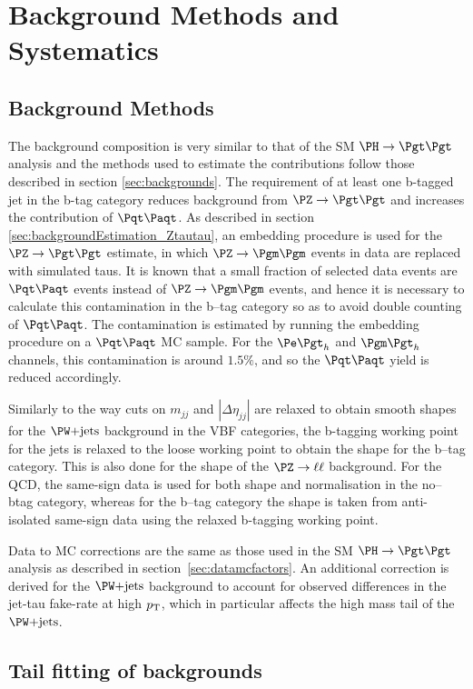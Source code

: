 \section{Background Methods and Systematics}
\label{sec:mssmBackgroundsSysts}

\subsection{Background Methods}
\label{sec:mssmBackgrounds}
The background composition is very similar to that of the \ac{SM} $\HToTauTau$
analysis and the methods used to estimate the contributions follow those
described in section \ref{sec:backgrounds}. The requirement of at least one
b-tagged jet in the b-tag category reduces background from $\ZToTauTau$
and increases the contribution of $\ttbar$. As described in section
\ref{sec:backgroundEstimation_Ztautau}, an embedding procedure is used for the
$\ZToTauTau$ estimate, in which $\PZ\to\Pgm\Pgm$ events in data are replaced
with simulated taus. It is known that a small fraction of selected data events
are $\ttbar$ events instead of $\PZ\to\Pgm\Pgm$ events, and hence it is
necessary to calculate this contamination in the b--tag category so as to avoid
double counting of $\ttbar$. The contamination is estimated by running the
embedding procedure on a $\ttbar$ \ac{MC} sample. For the $\etau$ and $\mutau$ channels, this
contamination is around $1.5\%$, and so the $\ttbar$ yield is reduced
accordingly. 

Similarly to the way cuts on $m_{jj}$ and $|\Delta\eta_{jj}|$ are relaxed to
obtain smooth shapes for the $\WJets$ background in the VBF categories, the
b-tagging working point for the jets is relaxed to the loose working point to
obtain the shape for the b--tag category. This is also done for the shape of
the $\PZ\to\ell\ell$ background. For the QCD, the same-sign data is used for
both shape and normalisation in the no--btag category, whereas for the b--tag
category the shape is taken from anti-isolated same-sign data using the relaxed
b-tagging working point.

Data to \ac{MC} corrections are the same as those used in the \ac{SM}
$\HToTauTau$ analysis as described in section~\ref{sec:datamcfactors}. An
additional correction is derived for the $\WJets$ background to account for
observed differences in the jet-tau fake-rate at high $p_{\mathrm{T}}$, which in particular
affects the high mass tail of the $\WJets$. 

\subsection{Tail fitting of backgrounds}
\label{sec:tailfitting}

